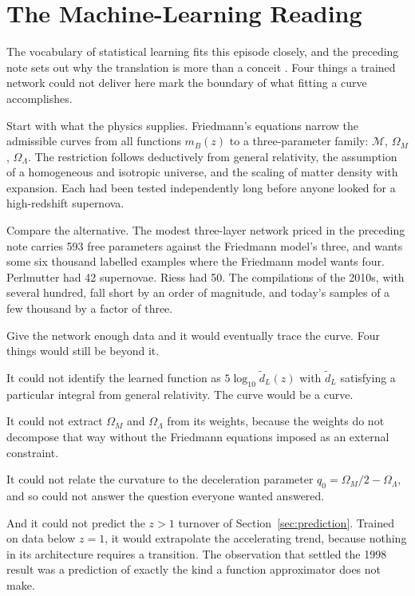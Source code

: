\documentclass[11pt]{article}
\begin{document}
\section{The Machine-Learning Reading}

The vocabulary of statistical learning fits this episode closely, and the
preceding note sets out why the translation is more than a conceit
\citep{sargent2025sources}.  Four things a trained network could not deliver
here mark the boundary of what fitting a curve accomplishes.

Start with what the physics supplies.  Friedmann's equations narrow the
admissible curves from all functions $m_B(z)$ to a
three-parameter family: $\mathcal{M}$, $\Omega_M$, $\Omega_\Lambda$.  The
restriction follows deductively from general relativity, the assumption of a
homogeneous and isotropic universe, and the scaling of matter density with
expansion.  Each had been tested independently long before anyone looked for a
high-redshift supernova.

Compare the alternative.  The modest three-layer network priced in the
preceding note carries 593 free parameters against the Friedmann model's
three, and wants some six thousand labelled examples where the Friedmann model
wants four.  Perlmutter had 42 supernovae.  Riess had 50.  The compilations of
the 2010s, with several hundred, fall short by an order of magnitude, and
today's samples of a few thousand by a factor of three.

Give the network enough data and it would eventually trace the curve.  Four
things would still be beyond it.

It could not identify the learned function as $5\log_{10}\tilde d_L(z)$ with
$\tilde d_L$ satisfying a particular integral from general relativity.  The
curve would be a curve.

It could not extract $\Omega_M$ and $\Omega_\Lambda$ from its weights, because
the weights do not decompose that way without the Friedmann equations imposed
as an external constraint.

It could not relate the curvature to the deceleration parameter
$q_0 = \Omega_M/2 - \Omega_\Lambda$, and so could not answer the question
everyone wanted answered.

And it could not predict the $z > 1$ turnover of
Section~\ref{sec:prediction}.  Trained on data
below $z = 1$, it would extrapolate the accelerating trend, because nothing in
its architecture requires a transition.  The observation that settled the 1998
result was a prediction of exactly the kind a function approximator does not
make.
\end{document}
